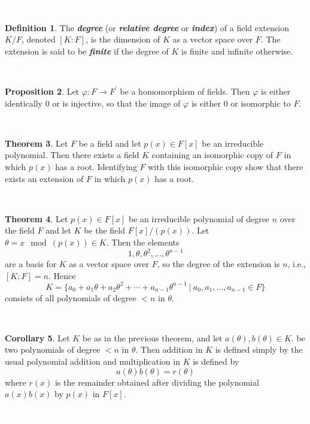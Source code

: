 \documentclass{article}
\theoremstyle{definition}
\newtheorem{thm}{Theorem}[section]
\newtheorem{prop}[thm]{Proposition}
\newtheorem{cor}[thm]{Corollary}
\newtheorem{defn}[thm]{Definition}
\newcommand{\nl}{\textcolor{white}{nothing}}
\newcommand{\ra}{\rightarrow}
\newcommand{\p}{\prime}
\newcommand{\vphi}{\varphi}
\begin{document}
\nl

\begin{defn}
The \textit{\textbf{degree}} (or \textit{\textbf{relative degree}} or \textit{\textbf{index}}) of a field extension $K/F$, denoted $[K:F]$, is the dimension of $K$ as a vector space over $F$. The extension is said to be \textit{\textbf{finite}} if the degree of $K$ is finite and infinite otherwise.
\end{defn}

\nl

\begin{prop}
Let $\vphi: F\ra F^\p$ be a homomorphism of fields. Then $\vphi$ is either identically 0 or is injective, so that the image of $\vphi$ is either 0 or isomorphic to $F$.
\end{prop}

\nl

\begin{thm}
Let $F$ be a field and let $p(x)\in F[x]$ be an irreducible polynomial. Then there exists a field $K$ containing an isomorphic copy of $F$ in which $p(x)$ has a root. Identifying $F$ with this isomorphic copy show that there exists an extension of $F$ in which $p(x)$ has a root.
\end{thm}

\nl

\begin{thm}
Let $p(x)\in F[x]$ be an irreducible polynomial of degree $n$ over the field $F$ and let $K$ be the field $F[x]/(p(x))$. Let $\theta = x\mod(p(x))\in K$. Then the elements 
\[1, \theta, \theta^2,\ldots, \theta^{n-1}\]
are a basis for $K$ as a vector space over $F$, so the degree of the extension is $n$, i.e., $[K:F] = n$. Hence
\[K = \{a_0 + a_1\theta + a_2\theta^2 + \cdots + a_{n - 1}\theta^{n - 1}\ |\ a_0, a_1, \ldots, a_{n - 1}\in F\}\]
consists of all polynomials of degree $<n$ in $\theta$.
\end{thm}

\nl

\begin{cor}
Let $K$ be as in the previous theorem, and let $a(\theta), b(\theta)\in K$. be two polynomials of degree $<n$ in $\theta$. Then addition in $K$ is defined simply by the usual polynomial addition and multiplication in $K$ is defined by
\[a(\theta)b(\theta) = r(\theta)\]
where $r(x)$ is the remainder obtained after dividing the polynomial $a(x)b(x)$ by $p(x)$ in $F[x]$.
\end{cor}

\nl
\end{document}
